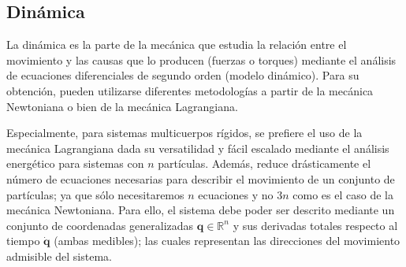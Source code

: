 \subsection{Dinámica}
    La dinámica es la parte de la mecánica que estudia la relación entre el movimiento y las causas que lo producen
    (fuerzas o torques) mediante el análisis de ecuaciones diferenciales de segundo orden (modelo dinámico). Para su
    obtención, pueden utilizarse diferentes metodologías a partir de la mecánica Newtoniana o bien de la mecánica
    Lagrangiana. 
    
    Especialmente, para sistemas multicuerpos rígidos, se prefiere el uso de la mecánica Lagrangiana dada su versatilidad
    y fácil escalado mediante el análisis energético para sistemas con $n$ partículas. Además, reduce drásticamente el número de ecuaciones
    necesarias para describir el movimiento de un conjunto de partículas; ya que sólo necesitaremos $n$ ecuaciones y no $3n$ como es el caso 
    de la mecánica Newtoniana.    
    Para ello, el sistema debe poder ser descrito mediante un conjunto de coordenadas generalizadas $\boldsymbol{q} \in \mathbb{R}^n$ y sus 
    derivadas totales respecto al tiempo $\boldsymbol{\dot{q}}$ (ambas medibles); las cuales representan las direcciones del movimiento
    admisible del sistema. 
    

